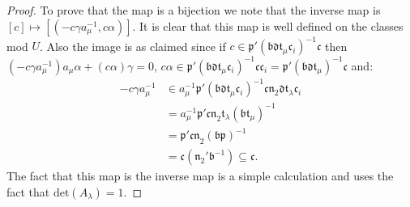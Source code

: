 \documentclass[a4paper,oneside]{amsart}
\theoremstyle{plain}
\theoremstyle{definition}
\begin{document}
\begin{proof}
To prove that the map is a bijection we note that the inverse map is $[c] \mapsto [(-c\gamma a_{\mu}^{-1}, c\alpha)]$. It is clear that this map is well defined on the classes mod $U$. Also the image is as claimed since if $c\in \mathfrak{p'}(\mathfrak{bdt}_{\mu}\mathfrak{c}_i)^{-1}\mathfrak{c}$ then $(-c\gamma a_{\mu}^{-1})a_{\mu}\alpha + (c\alpha)\gamma = 0$, $c\alpha\in \mathfrak{p'}(\mathfrak{bdt}_{\mu}\mathfrak{c}_i)^{-1}\mathfrak{cc}_i = \mathfrak{p'}(\mathfrak{bdt}_{\mu})^{-1}\mathfrak{c}$ and: \begin{align*} -c\gamma a_{\mu}^{-1} &\in a_{\mu}^{-1}\mathfrak{p'}(\mathfrak{bdt}_{\mu}\mathfrak{c}_i)^{-1}\mathfrak{cn}_2\mathfrak{dt}_{\lambda}\mathfrak{c}_i\\ &=a_{\mu}^{-1}\mathfrak{p'cn}_2\mathfrak{t}_{\lambda}(\mathfrak{bt}_{\mu})^{-1}\\ &= \mathfrak{p'cn}_2(\mathfrak{bp})^{-1}\\ &=\mathfrak{c}(\mathfrak{n}_2'\mathfrak{b}^{-1}) \subseteq \mathfrak{c}.\end{align*} The fact that this map is the inverse map is a simple calculation and uses the fact that $\text{det}(A_{\lambda}) = 1$.


\end{proof}
\end{document}
